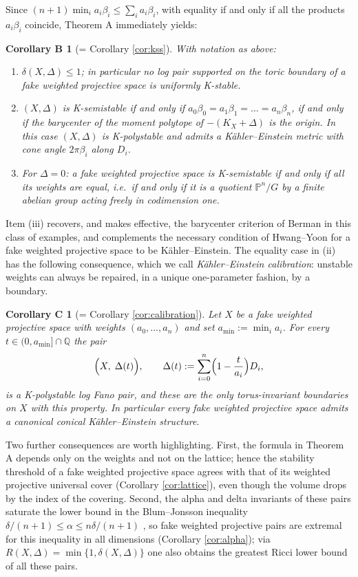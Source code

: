 \documentclass[11pt]{amsart}
\newtheorem*{corollaryB}{Corollary B}
\newtheorem*{corollaryC}{Corollary C}
\theoremstyle{definition}
\theoremstyle{remark}
\newcommand{\Q}{\mathbb{Q}}
\newcommand{\PP}{\mathbb{P}}
\begin{document}
Since \((n+1)\min_i a_i\beta_i \le \sum_i a_i\beta_i\), with equality if
and only if all the products \(a_i\beta_i\) coincide, Theorem A immediately
yields:

\begin{corollaryB}[= Corollary \ref{cor:kss}]
With notation as above:
\begin{enumerate}[label=\textup{(\roman*)}]
\item \(\delta(X,\Delta)\le 1\); in particular no log pair supported on
the toric boundary of a fake weighted projective space is uniformly
K-stable.
\item \((X,\Delta)\) is K-semistable if and only if
\(a_0\beta_0=a_1\beta_1=\dots=a_n\beta_n\), if and only if the barycenter
of the moment polytope of \(-(K_X+\Delta)\) is the origin. In this case
\((X,\Delta)\) is K-polystable and admits a K\"ahler--Einstein metric with
cone angle \(2\pi\beta_i\) along \(D_i\).
\item For \(\Delta=0\): a fake weighted projective space is K-semistable
if and only if all its weights are equal, i.e.\ if and only if it is a
quotient \(\PP^n/G\) by a finite abelian group acting freely in
codimension one.
\end{enumerate}
\end{corollaryB}

Item (iii) recovers, and makes effective, the barycenter criterion of
Berman \cite{Ber16} in this class of examples, and complements the
necessary condition of Hwang--Yoon \cite{HY22} for a fake weighted
projective space to be K\"ahler--Einstein. The equality case in (ii) has
the following consequence, which we call \emph{K\"ahler--Einstein
calibration}: unstable weights can always be repaired, in a unique
one-parameter fashion, by a boundary.

\begin{corollaryC}[= Corollary \ref{cor:calibration}]
Let \(X\) be a fake weighted projective space with weights
\((a_0,\dots,a_n)\) and set \(a_{\min}:=\min_i a_i\). For every
\(t\in(0,a_{\min}]\cap\Q\) the pair
\[
\Bigl(X,\;\Delta(t)\Bigr),\qquad
\Delta(t) := \sum_{i=0}^n \Bigl(1-\frac{t}{a_i}\Bigr) D_i ,
\]
is a K-polystable log Fano pair, and these are the \emph{only}
torus-invariant boundaries on \(X\) with this property. In particular
every fake weighted projective space admits a canonical conical
K\"ahler--Einstein structure.
\end{corollaryC}

Two further consequences are worth highlighting. First, the formula in
Theorem A depends only on the weights and not on the lattice; hence the
stability threshold of a fake weighted projective space agrees with that of
its weighted projective universal cover (Corollary \ref{cor:lattice}),
even though the volume drops by the index of the covering. Second, the
alpha and delta invariants of these pairs saturate the lower bound in the
Blum--Jonsson inequality
\(\delta/(n+1)\le\alpha\le n\delta/(n+1)\) \cite{BJ20}, so fake weighted
projective pairs are extremal for this inequality in all dimensions
(Corollary \ref{cor:alpha}); via
\(R(X,\Delta)=\min\{1,\delta(X,\Delta)\}\) \cite{CRZ19,BBJ21} one also
obtains the greatest Ricci lower bound of all these pairs.
\end{document}

